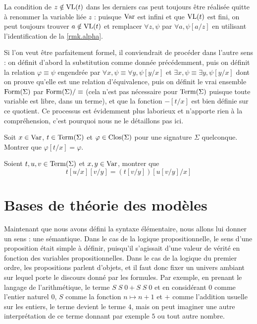 \begin{remark}
  La condition de $z\notin\operatorname{VL}(t)$ dans les derniers cas peut toujours être
  réalisée quitte à renommer la variable liée $z$ : puisque $\operatorname{Var}$ est infini
  et que $\operatorname{VL}(t)$ est fini, on peut toujours trouver $a\notin\operatorname{VL}(t)$ et remplacer
  $\forall z, \psi$ par $\forall a, \psi[a/z]$ en utilisant l'identification de
  la \cref{rmk.alpha}.

  Si l'on veut être parfaitement formel, il conviendrait de procéder dans l'autre
  sens : on définit d'abord la substitution comme donnée précédemment, puis on
  définit la relation $\varphi \equiv \psi$ engendrée par
  $\forall x, \psi \equiv \forall y, \psi[y/x]$ et
  $\exists x,\psi \equiv\exists y, \psi[y/x]$ dont on prouve qu'elle est une
  relation d'équivalence, puis on définit le \og vrai\fg{} ensemble
  $\operatorname{Form}(\Sigma)$ par $\operatorname{Form}(\Sigma)/ \equiv$ (cela n'est pas nécessaire
  pour $\operatorname{Term}(\Sigma)$ puisque toute variable est libre, dans un terme), et que
  la fonction $-[t/x]$ est bien définie sur ce quotient. Ce processus est
  évidemment plus laborieux et n'apporte rien à la compréhension, c'est pourquoi
  nous ne le détaillons pas ici.
\end{remark}

\begin{exercise}
  Soit $x\in \operatorname{Var}$, $t\in\operatorname{Term}(\Sigma)$ et $\varphi\in\operatorname{Clos}(\Sigma)$ pour une
  signature $\Sigma$ quelconque. Montrer que $\varphi[t/x] = \varphi$.
\end{exercise}

\begin{exercise}
  Soient $t,u,v\in\operatorname{Term}(\Sigma)$ et $x,y\in\operatorname{Var}$, montrer que
  \[t[u/x][v/y] = (t[v/y])[u[v/y]/x]\]
\end{exercise}

\section{Bases de théorie des modèles}

Maintenant que nous avons défini la syntaxe élémentaire, nous allons lui donner
un sens : une sémantique. Dans le cas de la logique propositionnelle, le sens
d'une proposition était simple à définir, puisqu'il s'agissait d'une valeur de
vérité en fonction des variables propositionnelles. Dans le cas de la logique du
premier ordre, les propositions parlent d'objets, et il faut donc fixer un
univers ambiant sur lequel porte le discours donné par les formules. Par exemple,
en prenant le langage de l'arithmétique, le terme $S\;S\;0 + S\;S\;0$ et en
considérant $0$ comme l'entier naturel $0$, $S$ comme la fonction
$n \mapsto n + 1$ et $+$ comme l'addition usuelle sur les entiers, le terme
devient le terme $4$, mais on peut imaginer une autre interprétation de ce terme
donnant par exemple $5$ ou tout autre nombre.

